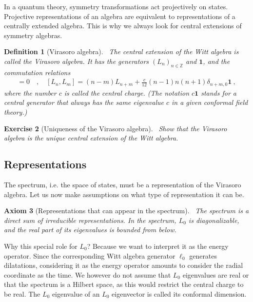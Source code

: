\documentclass[12pt, a4paper]{article}
\theoremstyle{break}
\newtheorem{exo}{Exercise}[section]
\newtheorem{hyp}[exo]{Axiom}
\newtheorem{defn}[exo]{Definition}
\begin{document}
In a quantum theory, symmetry transformations act projectively on states. 
Projective representations of an algebra are equivalent to representations of a centrally extended algebra. 
This is why we always look for central extensions of symmetry algebras.

\begin{defn}[Virasoro algebra]
 ~\label{def:vir}
 The central extension of the Witt algebra is called the Virasoro algebra. It has the generators $(L_n)_{n\in\mathbb{Z}}$ and $\mathbf 1$, and the commutation relations
 \begin{align}
  [\mathbf 1, L_n] = 0 \quad , \quad [L_n,L_m] = (n-m)L_{n+m} +\frac{c}{12}(n-1)n(n+1)\delta_{n+m,0}\mathbf 1 \ ,
  \label{eq:vir}
 \end{align}
 where the number $c$ is called the central charge. (The notation $c\mathbf 1$ stands for a central generator that always has the same eigenvalue $c$ in a given conformal field theory.)
\end{defn}

\begin{exo}[Uniqueness of the Virasoro algebra]
 ~\label{exo:vir}
 Show that the Virasoro algebra is the unique central extension of the Witt algebra.
\end{exo}


\subsection{Representations}

The spectrum, i.e. the space of states, must be a representation of the Virasoro algebra. Let us now make assumptions on what type of representation it can be.

\begin{hyp}[Representations that can appear in the spectrum]
 ~\label{hyp:rep}
 The spectrum is a direct sum of irreducible representations. In the spectrum, $L_0$ is diagonalizable, and the real part of its eigenvalues is bounded from below.
\end{hyp}
Why this special role for $L_0$? Because we want to interpret it as the energy operator. Since the corresponding Witt algebra generator $\ell_0$ generates dilatations, considering it as the energy operator amounts to consider the radial coordinate as the time. We however do not assume that $L_0$ eigenvalues are real or that the spectrum is a Hilbert space, as this would restrict the central charge to be real. The $L_0$ eigenvalue of an $L_0$ eigenvector is called its conformal dimension.
\end{document}
